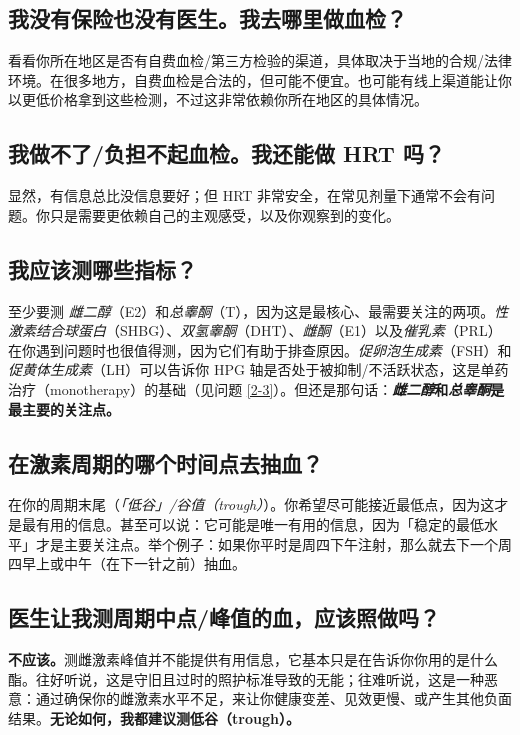 \documentclass{article}
\begin{document}
\subsection{我没有保险也没有医生。我去哪里做血检？}

看看你所在地区是否有自费血检/第三方检验的渠道，具体取决于当地的合规/法律环境。在很多地方，自费血检是合法的，但可能不便宜。也可能有线上渠道能让你以更低价格拿到这些检测，不过这非常依赖你所在地区的具体情况。

\subsection{我做不了/负担不起血检。我还能做 HRT 吗？}

显然，有信息总比没信息要好；但 HRT 非常安全，在常见剂量下通常不会有问题。你只是需要更依赖自己的主观感受，以及你观察到的变化。

\subsection{我应该测哪些指标？}

至少要测 \textit{雌二醇}（E2）和\textit{总睾酮}（T），因为这是最核心、最需要关注的两项。\textit{性激素结合球蛋白}（SHBG）、\textit{双氢睾酮}（DHT）、\textit{雌酮}（E1）以及\textit{催乳素}（PRL）在你遇到问题时也很值得测，因为它们有助于排查原因。\textit{促卵泡生成素}（FSH）和\textit{促黄体生成素}（LH）可以告诉你 HPG 轴是否处于被抑制/不活跃状态，这是单药治疗（monotherapy）的基础（见问题 \ref{2-3}）。但还是那句话：\textbf{\textit{雌二醇}和\textit{总睾酮}是最主要的关注点。}

\subsection{在激素周期的哪个时间点去抽血？}

在你的周期末尾（\textit{「低谷」/谷值（trough）}）。你希望尽可能接近最低点，因为这才是最有用的信息。甚至可以说：它可能是唯一有用的信息，因为「稳定的最低水平」才是主要关注点。举个例子：如果你平时是周四下午注射，那么就去下一个周四早上或中午（在下一针之前）抽血。

\subsection{医生让我测周期中点/峰值的血，应该照做吗？}

\textbf{不应该。}测雌激素峰值并不能提供有用信息，它基本只是在告诉你你用的是什么酯。往好听说，这是守旧且过时的照护标准导致的无能；往难听说，这是一种恶意：通过确保你的雌激素水平不足，来让你健康变差、见效更慢、或产生其他负面结果。\textbf{无论如何，我都建议测低谷（trough）。}
\end{document}
